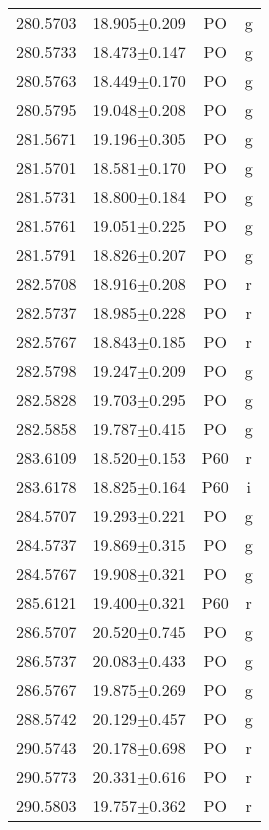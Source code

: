 \begin{table}
\begin{tabular}{cccc}
280.5703 & 18.905$\pm$0.209 & PO & g \\
280.5733 & 18.473$\pm$0.147 & PO & g \\
280.5763 & 18.449$\pm$0.170 & PO & g \\
280.5795 & 19.048$\pm$0.208 & PO & g \\
281.5671 & 19.196$\pm$0.305 & PO & g \\
281.5701 & 18.581$\pm$0.170 & PO & g \\
281.5731 & 18.800$\pm$0.184 & PO & g \\
281.5761 & 19.051$\pm$0.225 & PO & g \\
281.5791 & 18.826$\pm$0.207 & PO & g \\
282.5708 & 18.916$\pm$0.208 & PO & r \\
282.5737 & 18.985$\pm$0.228 & PO & r \\
282.5767 & 18.843$\pm$0.185 & PO & r \\
282.5798 & 19.247$\pm$0.209 & PO & g \\
282.5828 & 19.703$\pm$0.295 & PO & g \\
282.5858 & 19.787$\pm$0.415 & PO & g \\
283.6109 & 18.520$\pm$0.153 & P60 & r \\
283.6178 & 18.825$\pm$0.164 & P60 & i \\
284.5707 & 19.293$\pm$0.221 & PO & g \\
284.5737 & 19.869$\pm$0.315 & PO & g \\
284.5767 & 19.908$\pm$0.321 & PO & g \\
285.6121 & 19.400$\pm$0.321 & P60 & r \\
286.5707 & 20.520$\pm$0.745 & PO & g \\
286.5737 & 20.083$\pm$0.433 & PO & g \\
286.5767 & 19.875$\pm$0.269 & PO & g \\
288.5742 & 20.129$\pm$0.457 & PO & g \\
290.5743 & 20.178$\pm$0.698 & PO & r \\
290.5773 & 20.331$\pm$0.616 & PO & r \\
290.5803 & 19.757$\pm$0.362 & PO & r \\
\end{tabular}
\end{table}
